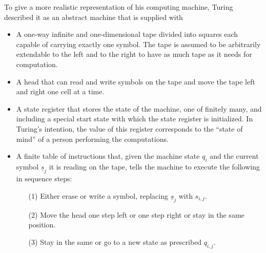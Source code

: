 \noindent To give a more realistic representation of his computing machine, Turing described it as an abstract machine that is supplied with

\begin{itemize}
\item A one-way infinite and one-dimensional tape divided into squares each capable of carrying exactly one symbol. The tape is assumed to be arbitrarily extendable to the left and to the right to have as much tape as it needs for computation.

\item A head that can read and write symbols on the tape and move the tape left and right one cell at a time.

\item A state register that stores the state of the machine, one of finitely many, and including a special start state with which the state register is initialized. In Turing's intention, the value of this register corresponds to the ``state of mind'' of a person performing the computations.

\item A finite table of instructions that, given the machine state $q_{i}$ and the current symbol $\underline{s}_{j}$ it is reading on the tape, tells the machine to execute the following in sequence steps:
\begin{enumerate}
\item[(1)] Either erase or write a symbol, replacing $\underline{s}_{j}$ with $s_{i,j}$.

\item[(2)] Move the head one step left or one step right or stay in the same position.

\item[(3)] Stay in the same or go to a new state as prescribed $q_{i,j}$.
\end{enumerate}
\end{itemize}

